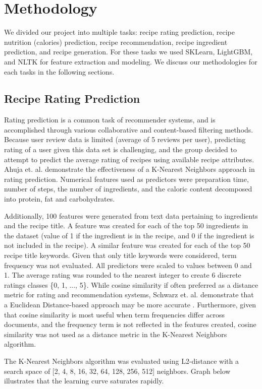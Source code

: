 \documentclass[sigconf]{acmart}
\begin{document}
\section{Methodology}
We divided our project into multiple tasks: recipe rating prediction, recipe nutrition (calories) prediction, recipe recommendation, recipe ingredient prediction, and recipe generation. For these tasks we used SKLearn, LightGBM, and NLTK for feature extraction and modeling. We discuss our methodologies for each tasks in the following sections.
\subsection{Recipe Rating Prediction}
Rating prediction is a common task of recommender systems, and is accomplished through various collaborative and content-based filtering methods. Because user review data is limited (average of 5 reviews per user), predicting rating of a user given this data set is challenging, and the group decided to attempt to predict the average rating of recipes using available recipe attributes. Ahuja et. al. \cite{RPKmeans} demonstrate the effectiveness of a K-Nearest Neighbors approach in rating prediction. Numerical features used as predictors were preparation time, number of steps, the number of ingredients, and the caloric content decomposed into protein, fat and carbohydrates. 

Additionally, 100 features were generated from text data pertaining to ingredients and the recipe title. A feature was created for each of the top 50 ingredients in the dataset (value of 1 if the ingredient is in the recipe, and 0 if the ingredient is not included in the recipe). A similar feature was created for each of the top 50 recipe title keywords. Given that only title keywords were considered, term frequency was not evaluated. All predictors were scaled to values between 0 and 1. The average rating was rounded to the nearest integer to create 6 discrete ratings classes \{0, 1, ..., 5\}. While cosine similarity if often preferred as a distance metric for rating and recommendation systems, Schwarz et. al. demonstrate that a Euclidean Distance-based approach may be more accurate \cite{RPSimilarity}. Furthermore, given that cosine similarity is most useful when term frequencies differ across documents, and the frequency term is not reflected in the features created, cosine similarity was not used as a distance metric in the K-Nearest Neighbors algorithm.

The K-Nearest Neighbors algorithm was evaluated using L2-distance with a search space of [2, 4, 8, 16, 32, 64, 128, 256, 512] neighbors. Graph below illustrates that the learning curve saturates rapidly.
\end{document}
